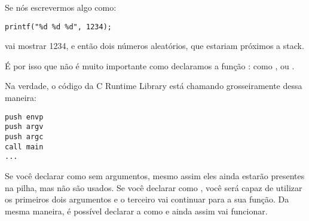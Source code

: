 Se nós escrevermos algo como:

\begin{lstlisting}
printf("%d %d %d", 1234);
\end{lstlisting}

\printf vai mostrar 1234, e então dois números aleatórios, que estariam próximos a stack.

\par
É por isso que não é muito importante como declaramos a função \main{}: como \main{},  ou .

Na verdade, o código da C Runtime Library está chamando grosseiramente \main{} dessa maneira:
	
\begin{lstlisting}[style=customasmx86]
push envp
push argv
push argc
call main
...
\end{lstlisting}

Se você declarar \main como \main sem argumentos, mesmo assim eles ainda estarão presentes na pilha, mas não são usados.
Se você declarar \main como , você será capaz de utilizar os primeiros dois argumentos e o terceiro vai continuar  para a sua função.
Da mesma maneira, é possível declarar a \main como  e ainda assim vai funcionar.


